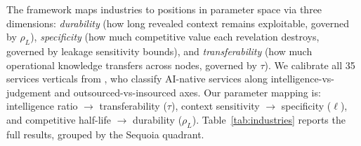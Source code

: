 \documentclass[12pt]{article}
\theoremstyle{definition}
\begin{document}
The framework maps industries to positions in parameter space via three dimensions: \textit{durability} (how long revealed context remains exploitable, governed by $\rho_L$), \textit{specificity} (how much competitive value each revelation destroys, governed by leakage sensitivity bounds), and \textit{transferability} (how much operational knowledge transfers across nodes, governed by $\tau$). We calibrate all 35 services verticals from \citet{sequoia2025services}, who classify AI-native services along intelligence-vs-judgement and outsourced-vs-insourced axes. Our parameter mapping is: intelligence ratio $\to$ transferability ($\tau$), context sensitivity $\to$ specificity ($\ell$), and competitive half-life $\to$ durability ($\rho_L$). Table~\ref{tab:industries} reports the full results, grouped by the Sequoia quadrant.
\end{document}
